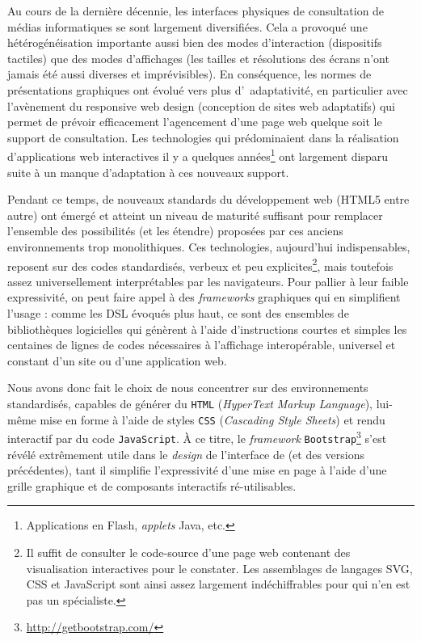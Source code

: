 Au cours de la dernière décennie, les interfaces physiques de consultation de médias informatiques se sont largement diversifiées.
Cela a provoqué une hétérogénéisation importante aussi bien des modes d'interaction (dispositifs tactiles) que des modes d'affichages (les tailles et résolutions des écrans n'ont jamais été aussi diverses et imprévisibles).
En conséquence, les normes de présentations graphiques ont évolué vers plus d'\og~adaptativité\fg{}, en particulier avec l'avènement du \og responsive web design\fg{} (\og conception de sites web adaptatifs\fg{}) qui permet de prévoir efficacement l'agencement d'une page web quelque soit le support de consultation.
Les technologies qui prédominaient dans la réalisation d'applications web interactives il y a quelques années\footnote{
	Applications en \textsf{Flash}, \textit{applets} Java, etc.
} ont largement disparu suite à un manque d'adaptation à ces nouveaux support.

Pendant ce temps, de nouveaux standards du développement web (\textsc{HTML5} entre autre) ont émergé et atteint un niveau de maturité suffisant pour remplacer l'ensemble des possibilités (et les étendre) proposées par ces anciens environnements trop monolithiques.
Ces technologies, aujourd'hui indispensables, reposent sur des codes standardisés, verbeux et peu explicites\footnote{
	Il suffit de consulter le code-source d'une page web contenant des visualisation interactives pour le constater.
	Les assemblages de langages SVG, CSS et JavaScript sont ainsi assez largement indéchiffrables pour qui n'en est pas un spécialiste.
}, mais toutefois assez universellement interprétables par les navigateurs.
Pour pallier à leur faible expressivité, on peut faire appel à des \textit{frameworks} graphiques qui en simplifient l'usage : comme les DSL évoqués plus haut, ce sont des ensembles de bibliothèques logicielles qui génèrent à l'aide d'instructions courtes et simples les centaines de lignes de codes nécessaires à l'affichage interopérable, universel et constant d'un site ou d'une application web.


Nous avons donc fait le choix de nous concentrer sur des environnements standardisés, capables de générer du \texttt{HTML} (\og \textit{HyperText Markup Language}\fg{}), lui-même mise en forme à l'aide de styles \texttt{CSS} (\og \textit{Cascading Style Sheets}\fg{}) et rendu interactif par du code \texttt{JavaScript}.
À ce titre, le \textit{framework} \texttt{Bootstrap}\footnote{\href{http://getbootstrap.com/}{http://getbootstrap.com/}} s'est révélé extrêmement utile dans le \textit{design} de l'interface de \simedb{} (et des versions précédentes), tant il simplifie l'expressivité d'une mise en page à l'aide d'une grille graphique et de composants interactifs ré-utilisables.

